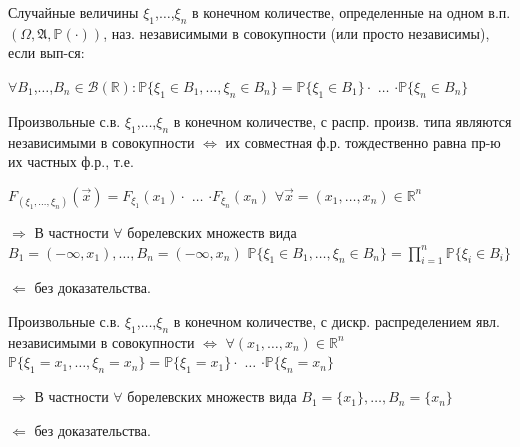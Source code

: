 \begin{defs}
	Случайные величины $\xi_1$,$\dots$,$\xi_n$ в конечном количестве, определенные на одном в.п. $(\Omega,\mathfrak{A},\mathbb{P}(\cdot))$, наз. независимыми
	в совокупности (или просто независимы), если вып-ся:

	$\forall B_1$,$\dots$,$B_n \in \mathcal{B}(\mathbb{R}) : \mathbb{P}\{\xi_1 \in B_1,\dots,\xi_n \in B_n\} = \mathbb{P}\{\xi_1 \in B_1\}\cdot$ $\dots$ $\cdot \mathbb{P}\{\xi_n \in B_n\}$
\end{defs}

\begin{proofs}
	Произвольные с.в. $\xi_1$,$\dots$,$\xi_n$ в конечном количестве, с распр. произв. типа являются
	независимыми в совокупности $\iff$ их совместная ф.р. тождественно равна пр-ю их частных ф.р., т.е.

	$F_{(\xi_1, \dots , \xi_n)}(\overrightarrow{x}) = F_{\xi_1}(x_1) \cdot$ $\dots$ $\cdot F_{\xi_n}(x_n)$ $\forall \overrightarrow{x} = (x_1,\ldots,x_n) \in \mathbb{R}^n$
	\begin{dokvo}

		$\Rightarrow$ В частности $\forall$ борелевских множеств вида $B_1 = (-\infty, x_1), \ldots, B_n = (-\infty, x_n)$ $\mathbb{P}\{\xi_1 \in B_1,\dots,\xi_n \in B_n\} = \prod\limits_{i=1}^{n}\mathbb{P}\{\xi_i \in B_i\}$

		$\Leftarrow$ без доказательства.
	\end{dokvo}
\end{proofs}

\begin{proofs}
	Произвольные с.в. $\xi_1$,$\dots$,$\xi_n$ в конечном количестве, с дискр. распределением явл. независимыми в совокупности $\iff$
	$\forall (x_1,\ldots,x_n) \in \mathbb{R}^n$ $\mathbb{P}\{\xi_1 = x_1,\dots,\xi_n = x_n\} = \mathbb{P}\{\xi_1 = x_1\}\cdot$ $\dots$ $\cdot \mathbb{P}\{\xi_n = x_n\}$
	\begin{dokvo}

		$\Rightarrow$ В частности $\forall$ борелевских множеств вида $B_1 = \{x_1\}, \ldots, B_n = \{x_n\}$

		$\Leftarrow$ без доказательства.
	\end{dokvo}
\end{proofs}

